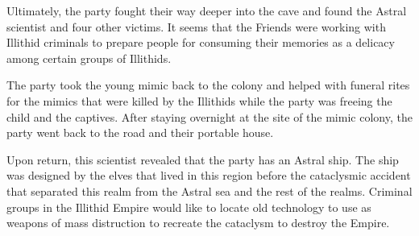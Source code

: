 Ultimately, the party fought their way deeper into the cave and found the Astral scientist and four other victims.
It seems that the Friends were working with Illithid criminals to prepare people for consuming their memories as a delicacy among certain groups of Illithids.

The party took the young mimic back to the colony and helped with funeral rites for the mimics that were killed by the Illithids while the party was freeing the child and the captives.
After staying overnight at the site of the mimic colony, the party went back to the road and their portable house.

Upon return, this scientist revealed that the party has an Astral ship.
The ship was designed by the elves that lived in this region before the cataclysmic accident that separated this realm from the Astral sea and the rest of the realms.
Criminal groups in the Illithid Empire would like to locate old technology to use as weapons of mass distruction to recreate the cataclysm to destroy the Empire.